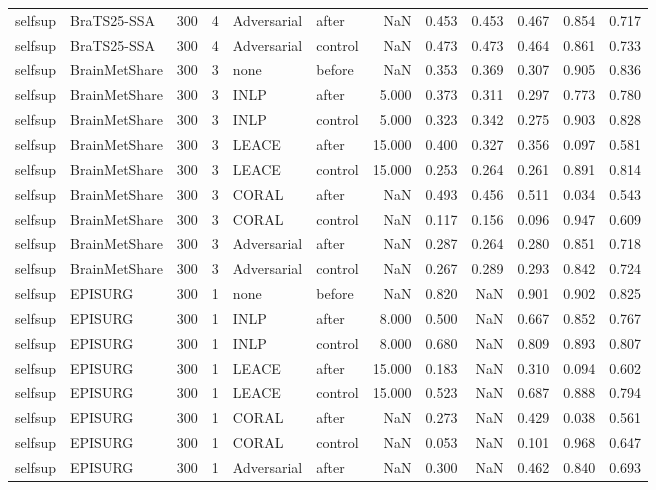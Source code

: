\begin{tabular}{llrrllrrrrrr}
selfsup & BraTS25-SSA & 300 & 4 & Adversarial & after & NaN & 0.453 & 0.453 & 0.467 & 0.854 & 0.717 \\
selfsup & BraTS25-SSA & 300 & 4 & Adversarial & control & NaN & 0.473 & 0.473 & 0.464 & 0.861 & 0.733 \\
selfsup & BrainMetShare & 300 & 3 & none & before & NaN & 0.353 & 0.369 & 0.307 & 0.905 & 0.836 \\
selfsup & BrainMetShare & 300 & 3 & INLP & after & 5.000 & 0.373 & 0.311 & 0.297 & 0.773 & 0.780 \\
selfsup & BrainMetShare & 300 & 3 & INLP & control & 5.000 & 0.323 & 0.342 & 0.275 & 0.903 & 0.828 \\
selfsup & BrainMetShare & 300 & 3 & LEACE & after & 15.000 & 0.400 & 0.327 & 0.356 & 0.097 & 0.581 \\
selfsup & BrainMetShare & 300 & 3 & LEACE & control & 15.000 & 0.253 & 0.264 & 0.261 & 0.891 & 0.814 \\
selfsup & BrainMetShare & 300 & 3 & CORAL & after & NaN & 0.493 & 0.456 & 0.511 & 0.034 & 0.543 \\
selfsup & BrainMetShare & 300 & 3 & CORAL & control & NaN & 0.117 & 0.156 & 0.096 & 0.947 & 0.609 \\
selfsup & BrainMetShare & 300 & 3 & Adversarial & after & NaN & 0.287 & 0.264 & 0.280 & 0.851 & 0.718 \\
selfsup & BrainMetShare & 300 & 3 & Adversarial & control & NaN & 0.267 & 0.289 & 0.293 & 0.842 & 0.724 \\
selfsup & EPISURG & 300 & 1 & none & before & NaN & 0.820 & NaN & 0.901 & 0.902 & 0.825 \\
selfsup & EPISURG & 300 & 1 & INLP & after & 8.000 & 0.500 & NaN & 0.667 & 0.852 & 0.767 \\
selfsup & EPISURG & 300 & 1 & INLP & control & 8.000 & 0.680 & NaN & 0.809 & 0.893 & 0.807 \\
selfsup & EPISURG & 300 & 1 & LEACE & after & 15.000 & 0.183 & NaN & 0.310 & 0.094 & 0.602 \\
selfsup & EPISURG & 300 & 1 & LEACE & control & 15.000 & 0.523 & NaN & 0.687 & 0.888 & 0.794 \\
selfsup & EPISURG & 300 & 1 & CORAL & after & NaN & 0.273 & NaN & 0.429 & 0.038 & 0.561 \\
selfsup & EPISURG & 300 & 1 & CORAL & control & NaN & 0.053 & NaN & 0.101 & 0.968 & 0.647 \\
selfsup & EPISURG & 300 & 1 & Adversarial & after & NaN & 0.300 & NaN & 0.462 & 0.840 & 0.693 \\

\end{tabular}
